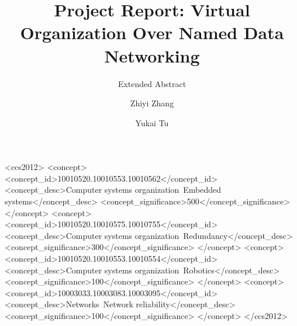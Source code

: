 \documentclass[sigconf]{acmart}
\begin{document}
\title{Project Report: Virtual Organization Over Named Data Networking}
\subtitle{Extended Abstract}


\author{Zhiyi Zhang}

\author{Yukai Tu}





\renewcommand{\shortauthors}{Z. Zhang et al.}




%
%
\begin{CCSXML}
<ccs2012>
 <concept>
  <concept_id>10010520.10010553.10010562</concept_id>
  <concept_desc>Computer systems organization~Embedded systems</concept_desc>
  <concept_significance>500</concept_significance>
 </concept>
 <concept>
  <concept_id>10010520.10010575.10010755</concept_id>
  <concept_desc>Computer systems organization~Redundancy</concept_desc>
  <concept_significance>300</concept_significance>
 </concept>
 <concept>
  <concept_id>10010520.10010553.10010554</concept_id>
  <concept_desc>Computer systems organization~Robotics</concept_desc>
  <concept_significance>100</concept_significance>
 </concept>
 <concept>
  <concept_id>10003033.10003083.10003095</concept_id>
  <concept_desc>Networks~Network reliability</concept_desc>
  <concept_significance>100</concept_significance>
 </concept>
</ccs2012>
\end{CCSXML}





\maketitle










\end{document}
